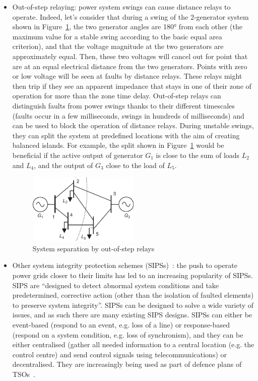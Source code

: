 \begin{itemize}
\begin{itemize}
        \item Out-of-step relaying: power system swings can cause distance relays to operate. Indeed, let's consider that during a swing of the 2-generator system shown in Figure~\ref{fig:OOS}, the two generator angles are 180° from each other (the maximum value for a stable swing according to the basic equal area criterion), and that the voltage magnitude at the two generators are approximately equal. Then, these two voltages will cancel out for point that are at an equal electrical distance from the two generators. Points with zero or low voltage will be seen at faults by distance relays. These relays might then trip if they see an apparent impedance that stays in one of their zone of operation for more than the zone time delay. Out-of-step relays can distinguish faults from power swings thanks to their different timescales (faults occur in a few milliseconds, swings in hundreds of milliseconds) and can be used to block the operation of distance relays. During unstable swings, they can split the system at predefined locations with the aim of creating balanced islands. For example, the split shown in Figure~\ref{fig:OOS} would be beneficial if the active output of generator \(G_1\) is close to the sum of loads \(L_2\) and \(L_4\), and the output of \(G_3\) close to the load of \(L_5\).
        \begin{figure}
            \centering
            \includegraphics[width = 0.5\textwidth]{Figs/Out_of_step.pdf}
            \caption{System separation by out-of-step relays~\cite{HorowitzBook}}
            \label{fig:OOS}
        \end{figure}
        \item Other system integrity protection schemes (SIPSs)~\cite{IEEE_SIPS, CIGRE_SIPS_tutorial}: the push to operate power grids closer to their limits has led to an increasing popularity of SIPSs. SIPS are ``designed to detect abnormal system conditions and take predetermined, corrective action (other than the isolation of faulted elements) to preserve system integrity''. SIPSs can be designed to solve a wide variety of issues, and as such there are many existing SIPS designs. SIPSs can either be event-based (respond to an event, e.g. loss of a line) or response-based (respond on a system condition, e.g. loss of synchronism), and they can be either centralised (gather all needed information to a central location (e.g. the control centre) and send control signals using telecommunications) or decentralised. They are increasingly being used as part of defence plans of TSOs~\cite{CigreDefensePlan, ENTSOEdefencePlan}.
    \end{itemize}
\end{itemize}



